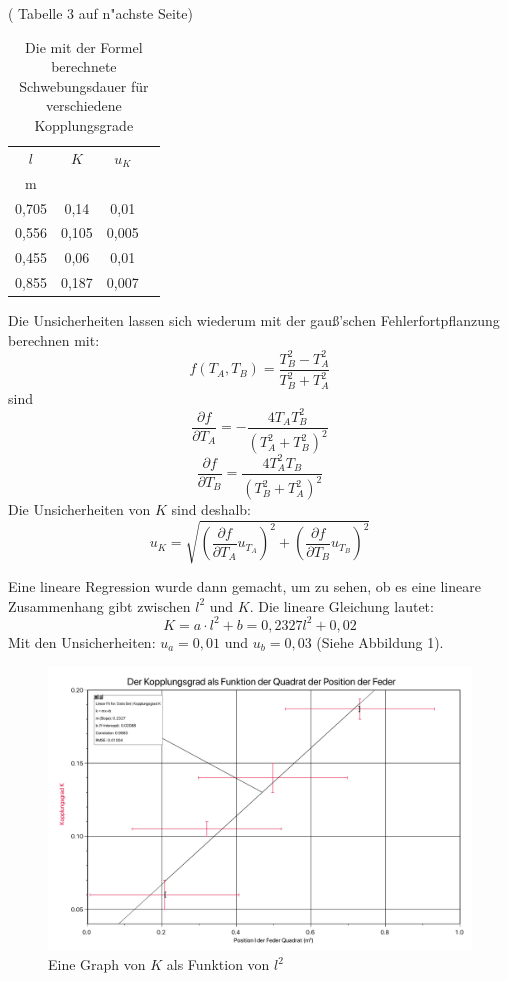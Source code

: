 \documentclass[11pt,a4paper]{article}
\begin{document}
( Tabelle 3 auf n"achste Seite)
\newpage
\begin{table}[h]
	\centering
	\begin{tabular*}{0.99\textwidth}{@{\extracolsep{\fill}}cccc}
		\toprule
		$l$ & $K$ & $u_{K}$  \\
		m &  &    \\
		\bottomrule
		0,705 & 0,14 & 0,01 \\
		0,556 & 0,105 & 0,005 \\
		0,455 & 0,06 & 0,01 \\
		0,855 & 0,187 & 0,007 \\
		\bottomrule
	\end{tabular*}
	\caption{Die mit der Formel berechnete Schwebungsdauer für verschiedene Kopplungsgrade}
	\label{tabelle}
\end{table}

Die Unsicherheiten lassen sich wiederum mit der gauß'schen Fehlerfortpflanzung berechnen mit:
$$f(T_A,T_B) = \frac{T_B^2-T_A^2}{T_B^2+T_A^2}$$
sind
$$\frac{\partial f}{\partial T_A} = -\frac{4T_A T_B^2}{(T_A^2+T_B^2)^2}$$
$$\frac{\partial f}{\partial T_B} = \frac{4T_A^2 T_B}{(T_B^2+T_A^2)^2}$$
Die Unsicherheiten von $K$ sind deshalb:
$$u_{K} = \sqrt{(\frac{\partial f}{\partial T_A}u_{T_A})^2+(\frac{\partial f}{\partial T_B}u_{T_B})^2}$$

Eine lineare Regression wurde dann gemacht, um zu sehen, ob es eine lineare Zusammenhang gibt zwischen $l^2$ und $K$. Die lineare Gleichung lautet:
$$ K = a\cdot l^2 +b = 0,2327 l^2 + 0,02 $$
Mit den Unsicherheiten: $u_a = 0,01$ und $u_b = 0,03$ (Siehe Abbildung 1). 
\begin{figure}[h]
	\centering
	\includegraphics[width=\textwidth]{Abb2}
	\caption{Eine Graph von $K$ als Funktion von $l^2$}
\end{figure}
\end{document}
